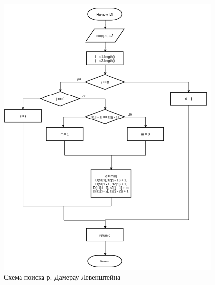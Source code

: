     \begin{figure}[h!]
        \centering
        \includegraphics[scale=1]{img/LevGraph}
        \caption{Схема поиска р. Дамерау-Левенштейна}
        \label{schema:matr:Dameray-Levenstein}
    \end{figure}

\newpage
